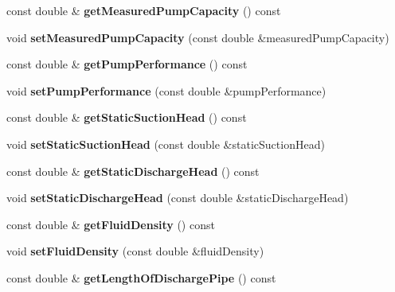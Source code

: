 \begin{DoxyCompactItemize}
const double \& {\bfseries get\+Measured\+Pump\+Capacity} () const
\item 
\mbox{\label{class_pump_data_a8c2cdd2e403d008195e4dc4162d3fc39}} 
void {\bfseries set\+Measured\+Pump\+Capacity} (const double \&measured\+Pump\+Capacity)
\item 
\mbox{\label{class_pump_data_af10029d336909921c94333646bdbfe56}} 
const double \& {\bfseries get\+Pump\+Performance} () const
\item 
\mbox{\label{class_pump_data_a6cddba8e1e57361dca2dce4dea0dc007}} 
void {\bfseries set\+Pump\+Performance} (const double \&pump\+Performance)
\item 
\mbox{\label{class_pump_data_a2d28984515e53e4b52b8b18f61183654}} 
const double \& {\bfseries get\+Static\+Suction\+Head} () const
\item 
\mbox{\label{class_pump_data_a331cc7f6ee1f3a2eb798ac8416ac88c7}} 
void {\bfseries set\+Static\+Suction\+Head} (const double \&static\+Suction\+Head)
\item 
\mbox{\label{class_pump_data_ad94a1a64c1ad59272e465114f6d09f01}} 
const double \& {\bfseries get\+Static\+Discharge\+Head} () const
\item 
\mbox{\label{class_pump_data_a2592c5b7b23bfcdbf91b2296c69c01be}} 
void {\bfseries set\+Static\+Discharge\+Head} (const double \&static\+Discharge\+Head)
\item 
\mbox{\label{class_pump_data_a6df3d172bd0ea687d533c2b426d613da}} 
const double \& {\bfseries get\+Fluid\+Density} () const
\item 
\mbox{\label{class_pump_data_a2ce9e3a645295f5c07fc8ecb7af7a85e}} 
void {\bfseries set\+Fluid\+Density} (const double \&fluid\+Density)
\item 
\mbox{\label{class_pump_data_a84a63b79e0cab83b492bc60eff041d00}} 
const double \& {\bfseries get\+Length\+Of\+Discharge\+Pipe} () const
\item 
\mbox{\label{class_pump_data_ae65ccbb7436899b7e7103669651c637a}} 

\end{DoxyCompactItemize}
